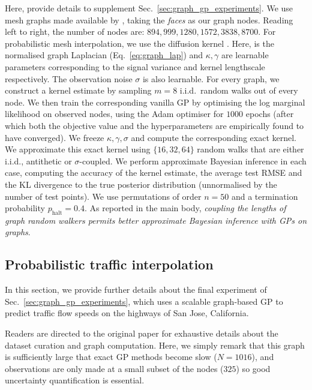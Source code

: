  \label{app:grf_gp_details}
Here, provide details to supplement Sec.~\ref{sec:graph_gp_experiments}.
We use mesh graphs made available by \citet{trimesh}, taking the \emph{faces} as our graph nodes.
Reading left to right, the number of nodes are: $894, 999, 1280, 1572, 3838, 8700$.
For probabilistic mesh interpolation, we use the diffusion kernel .
Here,  is the normalised graph Laplacian (Eq.~\ref{eq:graph_lap}) and $\kappa, \gamma$ are learnable parameters corresponding to the signal variance and kernel lengthscale respectively. 
The observation noise $\sigma$ is also learnable. For every graph, we construct a kernel estimate by sampling $m=8$ i.i.d.~random walks out of every node. 
We then train the corresponding vanilla GP by optimising the log marginal likelihood on observed nodes, using the Adam optimiser \citep{kingma2014adam} for $1000$ epochs (after which both the objective value and the hyperparameters are empirically found to have converged). 
We freeze $\kappa, \gamma, \sigma$ and compute the corresponding exact kernel. 
We approximate this exact kernel using $\{16,32,64\}$ random walks that are either i.i.d., antithetic or $\sigma$-coupled. We perform approximate Bayesian inference in each case, computing the accuracy of the kernel estimate, the average test RMSE and the KL divergence to the true posterior distribution (unnormalised by the number of test points).       
We use permutations of order $n=50$ and a termination probability $p_\textrm{halt}=0.4$.
As reported in the main body, \emph{coupling the lengths of graph random walkers permits better approximate Bayesian inference with GPs on graphs}. 

\subsection{Probabilistic traffic interpolation} \label{sec:traffic_expt}
In this section, we provide further details about the final experiment of Sec.~\ref{sec:graph_gp_experiments}, which uses a scalable graph-based GP to predict traffic flow speeds on the highways of San Jose, California.

 Readers are directed to the original paper \citep{borovitskiy2021matern} for exhaustive details about the dataset curation and graph computation.
Here, we simply remark that this graph is sufficiently large that exact GP methods become slow ($N=1016$), and observations are only made at a small subset of the nodes ($325$) so good uncertainty quantification is essential.


